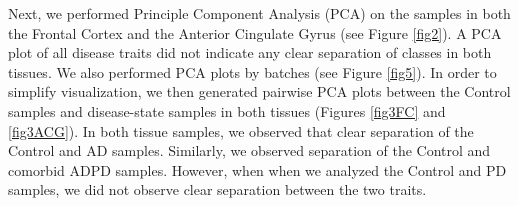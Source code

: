 Next, we performed Principle Component Analysis (PCA) on the samples in both the Frontal Cortex and the Anterior Cingulate Gyrus (see Figure \ref{fig2}). A PCA plot of all disease traits did not indicate any clear separation of classes in both tissues. We also performed PCA plots by batches (see Figure \ref{fig5}). In order to simplify visualization, we then generated pairwise PCA plots between the Control samples and disease-state samples in both tissues (Figures \ref{fig3FC} and \ref{fig3ACG}). In both tissue samples, we observed that clear separation of the Control and AD samples. Similarly, we observed separation of the Control and comorbid ADPD samples. However, when when we analyzed the Control and PD samples, we did not observe clear separation between the two traits.\\

